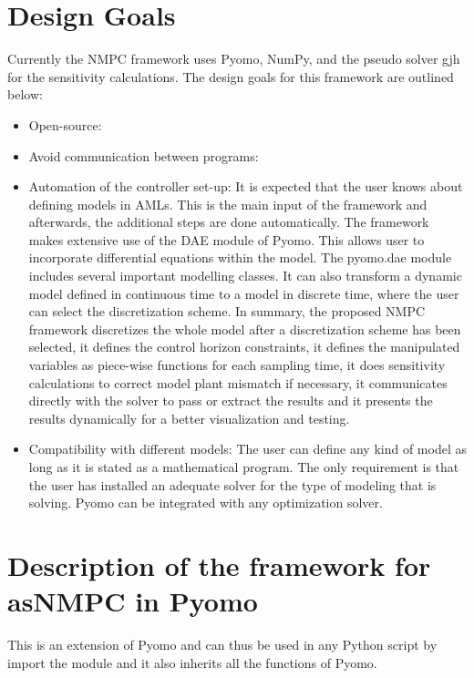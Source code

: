 \documentclass{article}
\begin{document}
\section{Design Goals}
Currently the NMPC framework uses Pyomo, NumPy, and the pseudo solver gjh for the sensitivity calculations.
The design goals for this framework are outlined below:
\begin{itemize}
	\item Open-source: 
	\item Avoid communication between programs:
	\item Automation of the controller set-up: It is expected that the user knows about defining models in AMLs. This is the main input of the framework and afterwards, the additional steps are done automatically.
	The framework makes extensive use of the DAE module of Pyomo.
	This allows user to incorporate differential equations within the model.
	The pyomo.dae module includes several important modelling classes.
	It can also transform a dynamic model defined in continuous time to a model in discrete time, where the user can select the discretization scheme.
	In summary, the proposed NMPC framework discretizes the whole model after a discretization scheme has been selected, it defines the control horizon constraints, it defines the manipulated variables as piece-wise functions for each sampling time, it does sensitivity calculations to correct model plant mismatch if necessary, it communicates directly with the solver to pass or extract the results and it presents the results dynamically for a better visualization and testing.
	\item Compatibility with different models: The user can define any kind of model as long as it is stated as a mathematical program.
	The only requirement is that the user has installed an adequate solver for the type of modeling that is solving.
	Pyomo can be integrated with any optimization solver.
\end{itemize}
\section{Description of the framework for asNMPC in Pyomo}
This is an extension of Pyomo and can thus be used in any Python script by import the module and it also inherits all the functions of Pyomo.
\end{document}
